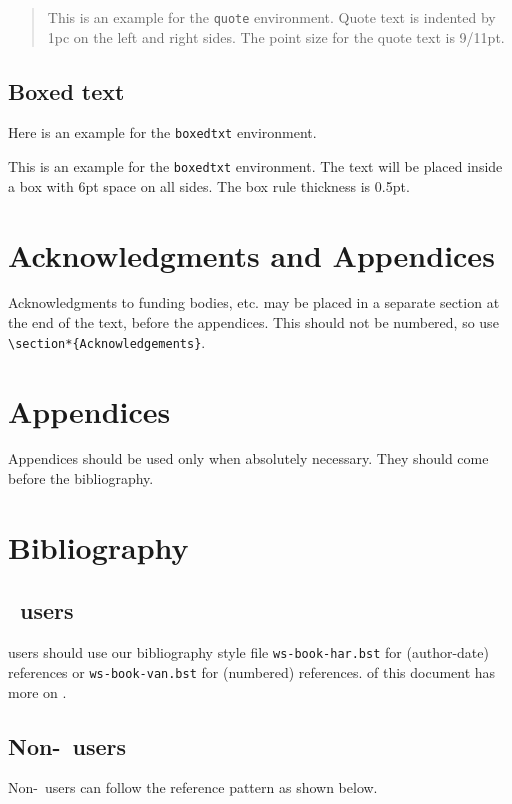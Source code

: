 \begin{quote}
This is an example for the \verb|quote| environment. Quote text is
indented by 1pc on the left and right sides. The point size for the
quote text is 9/11pt.
\end{quote}

\subsection{Boxed text}
Here is an example for the \verb|boxedtxt| environment.

\begin{boxedtxt}
This is an example for the \verb|boxedtxt| environment. The text will be
placed inside a box with 6pt space on all sides. The box rule
thickness is 0.5pt.
\end{boxedtxt}

\section{Acknowledgments and Appendices}
Acknowledgments to funding bodies, etc. may be placed in a separate
section at the end of the text, before the appendices. This should not
be numbered, so use \verb|\section*{Acknowledgements}|.

\section{Appendices}
Appendices should be used only when absolutely necessary. They
should come before the bibliography.

\section{Bibliography}

\subsection{\btex\ users}

\btex\index{\btex} users should use our bibliography style file
\verb|ws-book-har.bst| for (author-date) references or
\verb|ws-book-van.bst| for (numbered) references.  of this document has more on \btex.

\subsection{Non-\btex\ users}
Non-\btex\ users can follow the reference pattern as shown below.

